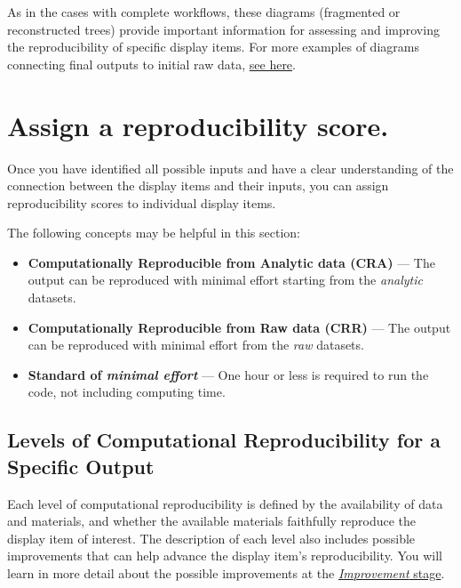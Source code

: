 \documentclass[
]{book}
\begin{document}
As in the cases with complete workflows, these diagrams (fragmented or reconstructed trees) provide important information for assessing and improving the reproducibility of specific display items. For more examples of diagrams connecting final outputs to initial raw data, \protect\hyperlink{examples-of-reproduction-trees}{see here}.

\hypertarget{score}{%
\section{Assign a reproducibility score.}\label{score}}

Once you have identified all possible inputs and have a clear understanding of the connection between the display items and their inputs, you can assign reproducibility scores to individual display items.

The following concepts may be helpful in this section:

\begin{itemize}
\item
  \textbf{Computationally Reproducible from Analytic data (CRA)} --- The output can be reproduced with minimal effort starting from the \emph{analytic} datasets.
\item
  \textbf{Computationally Reproducible from Raw data (CRR)} --- The output can be reproduced with minimal effort from the \emph{raw} datasets.
\item
  \textbf{Standard of \emph{minimal effort}} --- One hour or less is required to run the code, not including computing time.
\end{itemize}

\hypertarget{levels-of-computational-reproducibility-for-a-specific-output}{%
\subsection{Levels of Computational Reproducibility for a Specific Output}\label{levels-of-computational-reproducibility-for-a-specific-output}}

Each level of computational reproducibility is defined by the availability of data and materials, and whether the available materials faithfully reproduce the display item of interest. The description of each level also includes possible improvements that can help advance the display item's reproducibility. You will learn in more detail about the possible improvements at the \href{https://bitss.github.io/ACRE/improvements.html}{\emph{Improvement} stage}.
\end{document}
